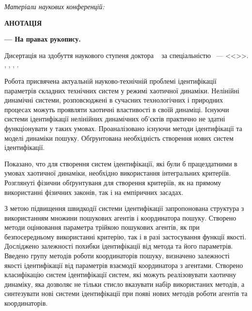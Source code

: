 \documentclass[a4paper,13pt]{atuaref}
\newcommand{\xsect}[1]{\vspace{0.15ex}\begin{center}\textbf{#1}\end{center}\vspace{4pt}\penalty10000}
\newcommand{\xxxsect}[1]{\vspace{0.02ex}\textit{#1}\vspace{0.02ex}\penalty10000}
\begin{document}
\xxxsect{Матеріали наукових конференцій:}

\printbibliography[heading=none, keyword=confer]



\xsect{АНОТАЦІЯ}

\textbf{\dissauthorUa}
\textbf{\booknameUa}
\textbf{--- На правах рукопису.}

Дисертація на здобуття наукового ступеня
доктора
\dissScopeUa\ {}
за спеціальністю
\dissSpecId\ --- <<\dissSpecUa>>.
\institutionUa, \belongUa, \cityUa, \bookyear.


Робота присвячена актуальній науково-технічній проблемі
ідентифікації параметрів складних технічних систем у режимі хаотичної динаміки.
Нелінійні динамічні системи, розповсюджені в сучасних технологічних і
природних процесах можуть проявляти хаотичні властивості в своїй динаміці.
Існуючи системи ідентифікації нелінійних динамічних об'єктів практично не
здатні функціонувати у таких умовах.
Проаналізовано існуючи методи ідентифікації та моделі динаміки пошуку.
Обґрунтована необхідність створення нових систем ідентифікації.

Показано, что для створення систем ідентифікації, які були б працездатними
в умовах хаотичної динаміки, необхідно використання інтегральних критеріїв.
Розглянуті фізични обґрунтуваня для створення критеріїв,
як на прямому використанні фізичних законів, так і на емпіричних засадах.

З метою підвищення швидкодії системи ідентифікації запропонована
структура з використанням множини пошукових агентів і координатора пошуку.
Створено методи оцінювання параметра трійкою пошукових агентів, як
при безпосередньому використанні критерію, так і в разі застосування функції якості.
Досліджено залежності похибки ідентифікації від метода та його параметрів.
Введено групу методів роботи координаторів пошуку,
визначено залежності якості ідентифікації від параметрів взаємодії
координатора з агентами.
Створено класифікацію систем ідентифікації систем, які можуть реалізовувати хаотичну динаміку,
яка дозволяє не тільки стисло вказувати набір використаних методів,
а синтезувати нові системи ідентифікації при появі нових методів роботи агентів та координаторів.
\end{document}
